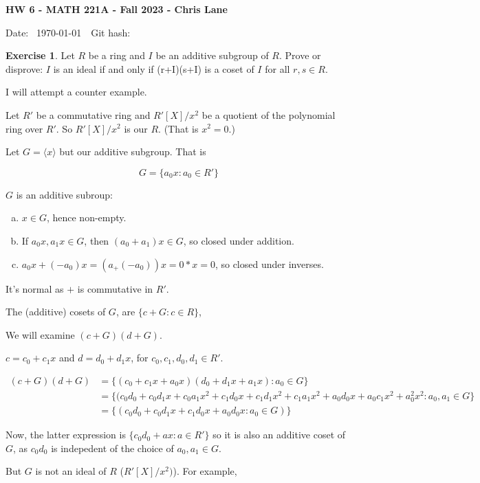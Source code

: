 \documentclass[11pt,oneside]{article}
\numberwithin{equation}{section}
\theoremstyle{definition}
\newtheorem{exercise}{Exercise}
\begin{document}
\textbf{HW 6 - MATH 221A - Fall 2023 - Chris Lane}

Date: \hhmmsstime{} \ \today \ \ Git hash: 


\begin{exercise}
  Let $R$ be a ring and $I$ be an additive subgroup of $R$.  Prove or
  disprove: $I$ is an ideal if and only if (r+I)(s+I) is a coset of
  $I$ for all $r, s \in R$.
\end{exercise}
\begin{solution}
  I will attempt a counter example.

  Let $R'$ be a commutative ring and $R'[X]/x^2$ be a quotient of the
  polynomial ring over $R'$. So $R'[X]/x^2$ is our $R$.  (That is $x^2 = 0$.)

  Let $G = \langle x \rangle$ but our additive subgroup.  That is

  $$
  G = \{ a_0 x : a_0 \in R' \}
  $$

  $G$ is an additive subroup:

  \begin{enumerate}[(a)]
  \item
    $x \in G$, hence non-empty.
  \item
    If $a_0 x, a_1x \in G$, then $(a_0 + a_1)x \in G$, so closed
    under addition.
  \item
    $a_0 x + (-a_0)x = (a_ + (-a_0)) x = 0 * x = 0$, so closed
    under inverses.
  \end{enumerate}

  It's normal as $+$ is commutative in $R'$. 
  
  The (additive) cosets of $G$, are $ \{ c + G : c \in R \} $,

  We will examine $(c + G) ( d + G)$.

  $c = c_0 + c_1 x$ and $d = d_0 + d_1 x$, for $c_0, c_1, d_0, d_1 \in R'$.

  \begin{align*}
    (c + G) (d + G) &= \{ (c_0 + c_1 x + a_0 x) ( d_0 + d_1 x + a_1 x): a_0 \in G \} \\
    &= \{ (c_0 d_0 + c_0 d_1 x + c_0 a_1 x^2 + c_1 d_0 x + c_1 d_1 x^ 2 + c_1 a_1 x^2 + a_0 d_0 x + a_0 c_1 x^2 + a_0 ^2 x^2 : a_0, a_1 \in G \} \\
    &= \{ (c_0 d_0 + c_0 d_1 x + c_1 d_0 x + a_0 d_0 x : a_0 \in G) \}  
  \end{align*}

  Now, the latter expression is $ \{ c_0 d_0 + a x : a \in R' \} $ so it is also
  an additive coset of $G$, as $c_0 d_0 $ is indepedent of the choice of $a_0, a_1 \in G$.

  But $G$ is not an ideal of $R$ ($R'[X]/x^2)$).  For example, 
    
\end{solution}
\end{document}
